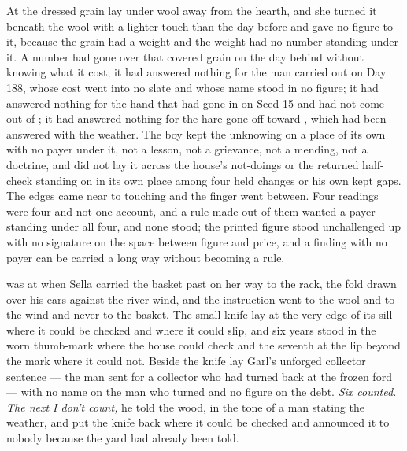 At  the dressed grain lay under wool away from the hearth, and she turned it beneath the wool with a lighter touch than the day before and gave no figure to it, because the grain had a weight and the weight had no number standing under it. A number had gone over that covered grain on the day behind without knowing what it cost; it had answered nothing for the man carried out on Day 188, whose cost went into no slate and whose name stood in no figure; it had answered nothing for the hand that had gone in on Seed 15 and had not come out of ; it had answered nothing for the hare gone off toward , which had been answered with the weather. The boy kept the unknowing on a place of its own with no payer under it, not a lesson, not a grievance, not a mending, not a doctrine, and did not lay it across the house's not-doings or the returned half-check standing on  in its own place among four held changes or his own kept gaps. The edges came near to touching and the finger went between. Four readings were four and not one account, and a rule made out of them wanted a payer standing under all four, and none stood; the printed figure stood unchallenged up  with no signature on the space between figure and price, and a finding with no payer can be carried a long way without becoming a rule.

\scenebreak

 was at  when Sella carried the basket past on her way to the rack, the fold drawn over his ears against the river wind, and the instruction went to the wool and to the wind and never to the basket. The small knife lay at the very edge of its sill where it could be checked and where it could slip, and six years stood in the worn thumb-mark where the house could check and the seventh at the lip beyond the mark where it could not. Beside the knife lay Garl's unforged collector sentence --- the man sent for a collector who had turned back at the frozen ford --- with no name on the man who turned and no figure on the debt. \emph{Six counted. The next I don't count,} he told the wood, in the tone of a man stating the weather, and put the knife back where it could be checked and announced it to nobody because the yard had already been told.

